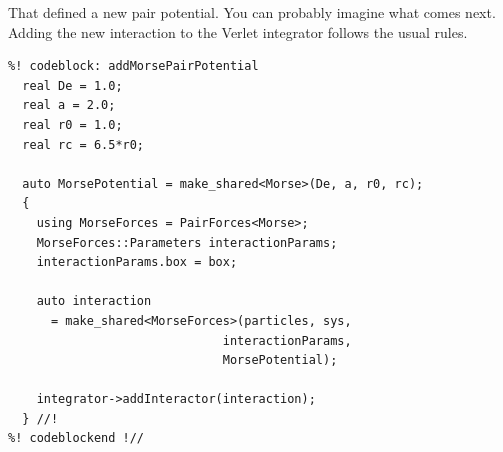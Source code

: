 That defined a new pair potential. You can probably imagine what comes next.
Adding the new interaction to the Verlet integrator follows the usual rules.
\begin{lstlisting}
%! codeblock: addMorsePairPotential
  real De = 1.0;
  real a = 2.0;
  real r0 = 1.0;
  real rc = 6.5*r0;

  auto MorsePotential = make_shared<Morse>(De, a, r0, rc);
  {
    using MorseForces = PairForces<Morse>;
    MorseForces::Parameters interactionParams;
    interactionParams.box = box;

    auto interaction
      = make_shared<MorseForces>(particles, sys,
                              interactionParams,
                              MorsePotential);

    integrator->addInteractor(interaction);
  } //!
%! codeblockend !//
\end{lstlisting}

